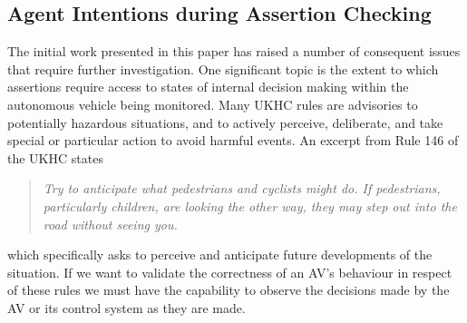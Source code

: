 
\subsection{Agent Intentions during Assertion Checking}
The initial work presented in this paper has raised a number of consequent issues that require further investigation. One significant topic is the extent to which assertions require access to states of internal decision making within the autonomous vehicle being monitored. Many UKHC rules are advisories to %
potentially hazardous situations, and to actively perceive, deliberate, and take special or particular action to avoid harmful events. 
% 
An excerpt from Rule 146 of the UKHC states \begin{quote} \textit{Try to anticipate what pedestrians and cyclists might do. If pedestrians, particularly children, are looking the other way, they may step out into the road without seeing you.} \end{quote} which specifically asks to perceive and anticipate future developments of the situation. If we want to validate the correctness of an AV's behaviour in respect of these rules we must have the capability to observe the decisions made by the AV or its control system as they are made. 





